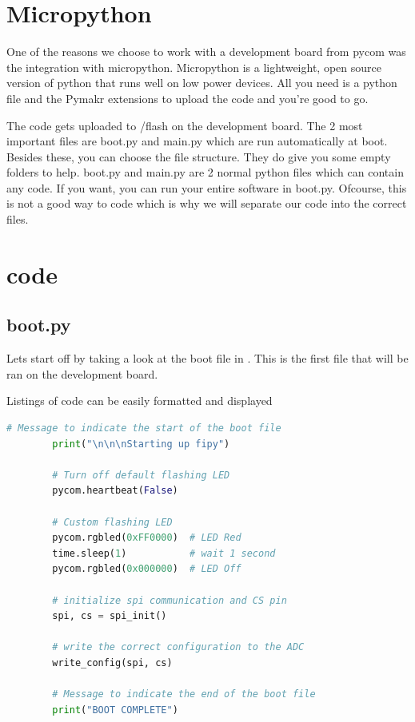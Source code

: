 \label{ch:Software}

\section{Micropython}
  One of the reasons we choose to work with a development board from pycom was the integration with micropython. Micropython is a lightweight, open source version of python that runs well on low power devices. All you need is a python file and the Pymakr extensions to upload the code and you're good to go. 

  The code gets uploaded to /flash on the development board.
  The 2 most important files are boot.py and main.py which are run automatically at boot. Besides these, you can choose the file structure. They do give you some empty folders to help. boot.py and main.py are 2 normal python files which can contain any code. If you want, you can run your entire software in boot.py. Ofcourse, this is not a good way to code which is why we will separate our code into the correct files.

\section{code}
  \subsection{boot.py}
    Lets start off by taking a look at the boot file in . This is the first file that will be ran on the development board.

    \begin{frame}[fragile]{Listings of code can be easily formatted and displayed}
        \begin{lstlisting}[language=Python, caption={Boot.py},label={list: boot}]
        # Message to indicate the start of the boot file
        print("\n\n\nStarting up fipy")

        # Turn off default flashing LED
        pycom.heartbeat(False)

        # Custom flashing LED
        pycom.rgbled(0xFF0000)  # LED Red
        time.sleep(1)           # wait 1 second
        pycom.rgbled(0x000000)  # LED Off

        # initialize spi communication and CS pin
        spi, cs = spi_init()

        # write the correct configuration to the ADC
        write_config(spi, cs)

        # Message to indicate the end of the boot file
        print("BOOT COMPLETE")

        \end{lstlisting}
    \end{frame}

